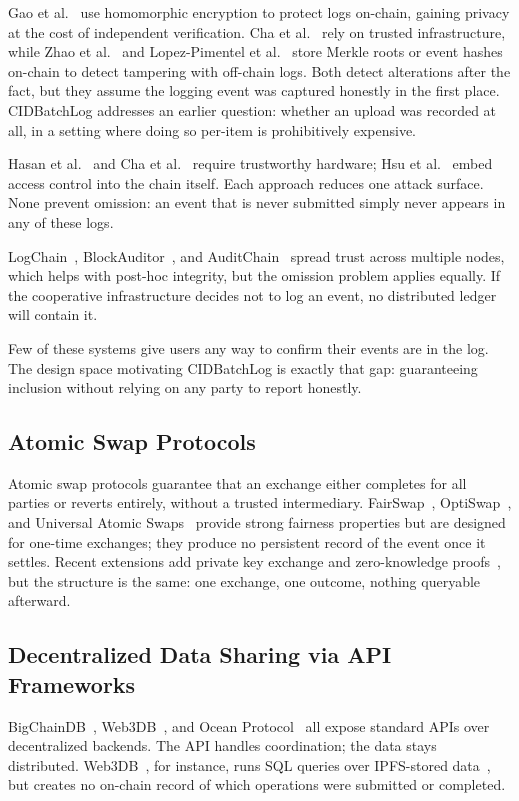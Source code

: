 \documentclass{svproc}
\def\ours{\xspace{CIDBatchLog}\xspace}
\begin{document}
Gao et al.~\cite{gao2025enterprise} use homomorphic encryption to protect logs on-chain, gaining privacy at the cost of independent verification. Cha et al.~\cite{cha2023blockchain} rely on trusted infrastructure, while Zhao et al.~\cite{zhao2019machine} and Lopez-Pimentel et al.~\cite{lopez2021rootlogchain} store Merkle roots or event hashes on-chain to detect tampering with off-chain logs. Both detect alterations after the fact, but they assume the logging event was captured honestly in the first place. \ours addresses an earlier question: whether an upload was recorded at all, in a setting where doing so per-item is prohibitively expensive.

Hasan et al.~\cite{hasan2009preventing} and Cha et al.~\cite{cha2023blockchain} require trustworthy hardware; Hsu et al.~\cite{hsu2020autonomous} embed access control into the chain itself. Each approach reduces one attack surface. None prevent omission: an event that is never submitted simply never appears in any of these logs.

LogChain~\cite{pourmajidi2018logchain}, BlockAuditor~\cite{xu2021k}, and AuditChain~\cite{vishnia2020auditchain} spread trust across multiple nodes, which helps with post-hoc integrity, but the omission problem applies equally. If the cooperative infrastructure decides not to log an event, no distributed ledger will contain it.

Few of these systems give users any way to confirm their events are in the log. The design space motivating \ours is exactly that gap: guaranteeing inclusion without relying on any party to report honestly.

\subsection{Atomic Swap Protocols}
\label{sec:AtomicSwap}
Atomic swap protocols guarantee that an exchange either completes for all parties or reverts entirely, without a trusted intermediary. FairSwap~\cite{dziembowski2018fairswap}, OptiSwap~\cite{eckey2020optiswap}, and Universal Atomic Swaps~\cite{thyagarajan2022universal} provide strong fairness properties but are designed for one-time exchanges; they produce no persistent record of the event once it settles. Recent extensions add private key exchange and zero-knowledge proofs~\cite{zhu2024atomic,tas2024atomic}, but the structure is the same: one exchange, one outcome, nothing queryable afterward.


\subsection{Decentralized Data Sharing via API Frameworks}
\label{sec:DecentralizedAPI}
BigChainDB~\cite{bigchaindb2018bigchaindb}, Web3DB~\cite{mukherjee2025web3db}, and Ocean Protocol~\cite{oceanprotocol2018} all expose standard APIs over decentralized backends. The API handles coordination; the data stays distributed. Web3DB~\cite{mukherjee2025web3db}, for instance, runs SQL queries over IPFS-stored data~\cite{fluencenetwork2024}, but creates no on-chain record of which operations were submitted or completed.
\end{document}
